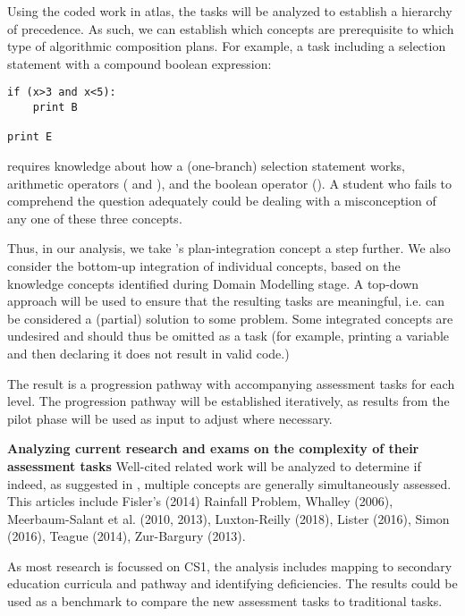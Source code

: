 Using the coded work in atlas, the tasks will be analyzed to establish a hierarchy of precedence. As such, we can establish which concepts are prerequisite to which type of algorithmic composition plans. For example, a task including a selection statement with a compound boolean expression:
\begin{verbatim}
if (x>3 and x<5):
    print B

print E
\end{verbatim}
requires knowledge about how a (one-branch) selection statement works, arithmetic operators (\jav{<} and \jav{>}), and the boolean operator (). A student who fails to comprehend the question adequately could be dealing with a misconception of any one of these three concepts.



Thus, in our analysis, we take \citeauthor{LuxtonReilly2018}'s plan-integration concept a step further. We also consider the bottom-up integration of individual concepts, based on the knowledge concepts identified during Domain Modelling stage. A top-down approach will be used to ensure that the resulting tasks are meaningful, i.e. can be considered a (partial) solution to some problem. Some integrated concepts are undesired and should thus be omitted as a task (for example, printing a variable and then declaring it does not result in valid code.)


The result is a progression pathway with accompanying assessment tasks for each level. The progression pathway will be established iteratively, as results from the pilot phase will be used as input to adjust where necessary.


\noindent \textbf{Analyzing current research and exams on the complexity of their assessment tasks}\newline
Well-cited related work will be analyzed to determine if indeed, as suggested in , multiple concepts are generally simultaneously assessed. This articles include Fisler's (2014) Rainfall Problem, Whalley (2006), Meerbaum-Salant et al. (2010, 2013), Luxton-Reilly (2018), Lister (2016), Simon (2016), Teague (2014), Zur-Bargury (2013).

As most research is focussed on CS1, the analysis includes mapping to secondary education curricula and pathway and identifying deficiencies. The results could be used as a benchmark to compare the new assessment tasks to traditional tasks.

%


